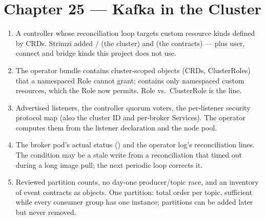 \section*{Chapter 25 --- Kafka in the Cluster}
\begin{enumerate}
  \item A controller whose reconciliation loop targets custom resource
  kinds defined by CRDs. Strimzi added /
  (the cluster) and  (the contracts) --- plus user,
  connect and bridge kinds this project does not use.
  \item The operator bundle contains cluster-scoped objects (CRDs,
  ClusterRoles) that a namespaced Role cannot grant; 
  contains only namespaced custom resources, which the Role now
  permits. Role vs.\ ClusterRole is the line.
  \item Advertised listeners, the controller quorum voters, the
  per-listener security protocol map (also the cluster ID and per-broker
  Services). The operator computes them from the listener declaration
  and the node pool.
  \item The broker pod's actual status () and the
  operator log's reconciliation lines. The condition may be a stale
  write from a reconciliation that timed out during a long image pull;
  the next periodic loop corrects it.
  \item Reviewed partition counts, no day-one producer/topic race, and
  an inventory of event contracts as objects. One partition: total
  order per topic, sufficient while every consumer group has one
  instance; partitions can be added later but never removed.
\end{enumerate}

